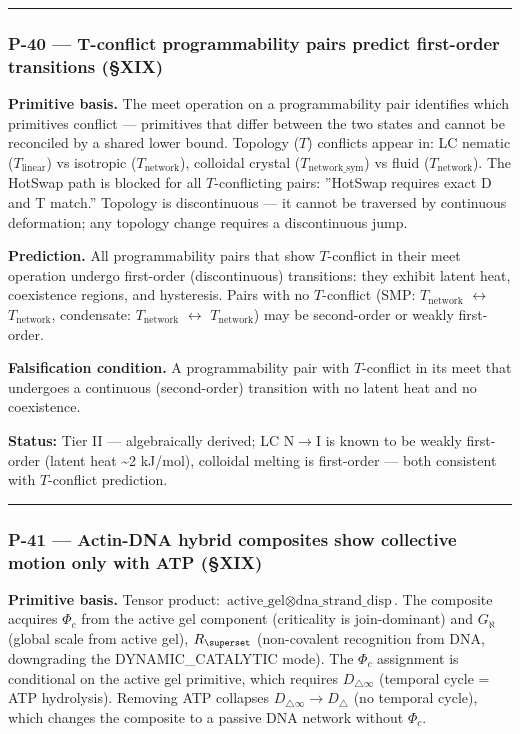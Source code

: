 \documentclass[12pt,a4paper]{article}
\begin{document}
\begin{center}
\rule{0.5\textwidth}{0.4pt}
\end{center}

\subsubsection{P-40 --- T-conflict programmability pairs predict first-order transitions (§XIX)}

\textbf{Primitive basis.} The meet operation on a programmability pair identifies which primitives conflict --- primitives that differ between the two states and cannot be reconciled by a shared lower bound. Topology ($T$) conflicts appear in: LC nematic ($T_\text{linear}$) vs isotropic ($T_\text{network}$), colloidal crystal ($T_{\text{network\_sym}}$) vs fluid ($T_\text{network}$). The HotSwap path is blocked for all $T$-conflicting pairs: ''HotSwap requires exact D and T match.'' Topology is discontinuous --- it cannot be traversed by continuous deformation; any topology change requires a discontinuous jump.

\textbf{Prediction.} All programmability pairs that show $T$-conflict in their meet operation undergo first-order (discontinuous) transitions: they exhibit latent heat, coexistence regions, and hysteresis. Pairs with no $T$-conflict (SMP: $T_\text{network}$ $\leftrightarrow$ $T_\text{network}$, condensate: $T_\text{network}$ $\leftrightarrow$ $T_\text{network}$) may be second-order or weakly first-order.

\textbf{Falsification condition.} A programmability pair with $T$-conflict in its meet that undergoes a continuous (second-order) transition with no latent heat and no coexistence.

\textbf{Status:} Tier II --- algebraically derived; LC N$\rightarrow$I is known to be weakly first-order (latent heat \textasciitilde{}2 kJ/mol), colloidal melting is first-order --- both consistent with $T$-conflict prediction.

\begin{center}
\rule{0.5\textwidth}{0.4pt}
\end{center}

\subsubsection{P-41 --- Actin-DNA hybrid composites show collective motion only with ATP (§XIX)}

\textbf{Primitive basis.} Tensor product: $\text{active\_gel} \otimes \text{dna\_strand\_disp}$. The composite acquires $\Phi_c$ from the active gel component (criticality is join-dominant) and $G_\aleph$ (global scale from active gel), $R_\superset$ (non-covalent recognition from DNA, downgrading the DYNAMIC\_CATALYTIC mode). The $\Phi_c$ assignment is conditional on the active gel primitive, which requires $D_{\triangle\infty}$ (temporal cycle = ATP hydrolysis). Removing ATP collapses $D_{\triangle\infty} \to D_\triangle$ (no temporal cycle), which changes the composite to a passive DNA network without $\Phi_c$.
\end{document}
